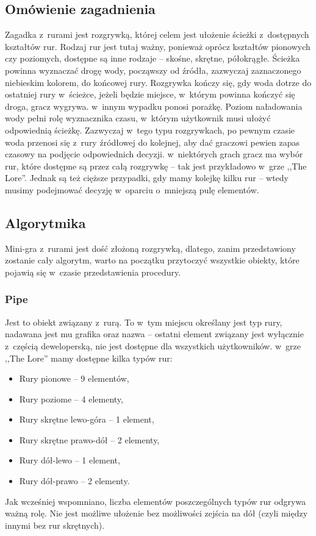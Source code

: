 \documentclass[oneside,polski,logo]{amuthesis}
\begin{document}
\subsection{Omówienie zagadnienia}
\par Zagadka z~rurami jest rozgrywką, której celem jest ułożenie ścieżki z~dostępnych kształtów rur. Rodzaj rur jest tutaj ważny, ponieważ oprócz kształtów pionowych czy poziomych, dostępne są inne rodzaje – skośne, skrętne, półokrągłe.
Ścieżka powinna wyznaczać drogę wody, począwszy od źródła, zazwyczaj zaznaczonego niebieskim kolorem, do końcowej rury. Rozgrywka kończy się, gdy woda dotrze do ostatniej rury w~ścieżce, jeżeli będzie miejsce, w~którym powinna kończyć się droga, gracz wygrywa. w~innym wypadku ponosi porażkę.
Poziom naładowania wody pełni rolę wyznacznika czasu, w~którym użytkownik musi ułożyć odpowiednią ścieżkę. Zazwyczaj w~tego typu rozgrywkach, po pewnym czasie woda przenosi się z~rury źródłowej do kolejnej, aby dać graczowi pewien zapas czasowy na podjęcie odpowiednich decyzji. w~niektórych grach gracz ma wybór rur, które dostępne są przez całą rozgrywkę – tak jest przykładowo w~grze ,,The Lore''. Jednak są też cięższe przypadki, gdy mamy kolejkę kilku rur – wtedy musimy podejmować decyzję w~oparciu o~mniejszą pulę elementów.
\subsection{Algorytmika}
\par Mini-gra z~rurami jest dość złożoną rozgrywką, dlatego, zanim przedstawiony zostanie cały algorytm, warto na początku przytoczyć wszystkie obiekty, które pojawią się w~czasie przedstawienia procedury.
\subsubsection{Pipe}
\par Jest to obiekt związany z~rurą. To w~tym miejscu określany jest typ rury, nadawana jest mu grafika oraz nazwa – ostatni element związany jest wyłącznie z~częścią deweloperską, nie jest dostępne dla wszystkich użytkowników. w~grze ,,The Lore'' mamy dostępne kilka typów rur:
\begin{itemize}
  \item Rury pionowe – 9 elementów,
  \item Rury poziome – 4 elementy,
  \item Rury skrętne lewo-góra – 1 element,
  \item Rury skrętne prawo-dół – 2 elementy,
  \item Rury dół-lewo –  1 element,
  \item Rury dół-prawo – 2 elementy.
\end{itemize}
Jak wcześniej wspomniano, liczba elementów poszczególnych typów rur odgrywa ważną rolę. Nie jest możliwe ułożenie bez możliwości zejścia na dół (czyli między innymi bez rur skrętnych). 
\end{document}

